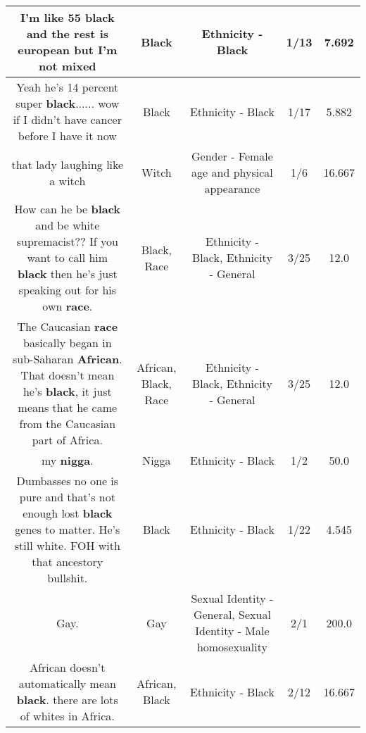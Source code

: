 \documentclass[11pt]{article}
\newlength\mylength
\begin{document}
\begin{center}
\begin{longtable}{|C{.65\mylength}|C{.30\mylength}|C{.12\mylength}|C{.12\mylength}|C{.12\mylength}|}
  \small I'm like 55 \textbf{black} and the rest is european but I'm not mixed\normalsize   & Black & Ethnicity - Black & 1/13 & 7.692 \\  \hline
  \small Yeah he's 14 percent super \textbf{black}...... wow if I didn't have cancer before I have it now\normalsize   & Black & Ethnicity - Black & 1/17 & 5.882 \\  \hline
  \small that lady laughing like a witch\normalsize   & Witch & Gender - Female age and physical appearance & 1/6 & 16.667 \\  \hline
  \small How can he be \textbf{black} and be white supremacist?? If you want to call him \textbf{black} then he's just speaking out for his own \textbf{race}.\normalsize   & Black, Race & Ethnicity - Black, Ethnicity - General & 3/25 & 12.0 \\  \hline
  \small The Caucasian \textbf{race} basically began in sub-Saharan \textbf{African}. That doesn't mean he's \textbf{black}, it just means that he came from the Caucasian part of Africa.\normalsize   & African, Black, Race & Ethnicity - Black, Ethnicity - General & 3/25 & 12.0 \\  \hline
  \small my \textbf{nigga}.\normalsize   & Nigga & Ethnicity - Black & 1/2 & 50.0 \\  \hline
  \small Dumbasses no one is pure and that's not enough lost \textbf{black} genes to matter. He's still white. FOH with that ancestory bullshit.\normalsize   & Black & Ethnicity - Black & 1/22 & 4.545 \\  \hline
  \small Gay.\normalsize   & Gay & Sexual Identity - General, Sexual Identity - Male homosexuality & 2/1 & 200.0 \\  \hline
  \small African doesn't automatically mean \textbf{black}. there are lots of whites in Africa.\normalsize   & African, Black & Ethnicity - Black & 2/12 & 16.667 \\  \hline

\end{longtable}
\end{center}
\end{document}
